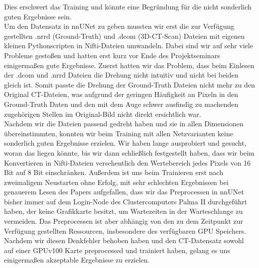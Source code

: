 Dies erschwert das Training und könnte eine Begründung für die nicht sonderlich guten Ergebnisse sein.\\
Um den Datensatz in nnUNet zu geben mussten wir erst die zur Verfügung gestellten .nrrd (Ground-Truth) und .dcom (3D-CT-Scan) Dateien mit eigenen kleinen Pythonscripten \cite{autoMLGithub} in Nifti-Dateien umwandeln. Dabei sind wir auf sehr viele Probleme gestoßen und hatten erst kurz vor Ende des Projektseminars einigermaßen gute Ergebnisse. Zuerst hatten wir das Problem, dass beim Einlesen der .dcom und .nrrd Dateien die Drehung nicht intuitiv und nicht bei beiden gleich ist. Somit passte die Drehung der Ground-Truth Dateien nicht mehr zu den Original CT-Dateien, was aufgrund der geringen Häufigkeit an Pixeln in den Ground-Truth Daten und den mit dem Auge schwer ausfindig zu machenden zugehörigen Stellen im Original-Bild nicht direkt ersichtlich war.\\
Nachdem wir die Dateien passend gedreht haben und sie in allen Dimensionen übereinstimmten, konnten wir beim Training mit allen Netzvarianten keine sonderlich  guten Ergebnisse erzielen. Wir haben lange ausprobiert und gesucht, woran das liegen könnte, bis wir dann schließlich festgestellt haben, dass wir beim Konvertieren in Nifti-Dateien versehentlich den Wertebereich jedes Pixels von 16 Bit auf 8 Bit einschränken. Außerdem ist uns beim Trainieren erst nach zweimaligem Neustarten ohne Erfolg, mit sehr schlechten Ergebnissen bei genauerem Lesen des Papers aufgefallen, dass wir das Preprocessen in nnUNet bisher immer auf dem Login-Node des Clustercomputers Palma II durchgeführt haben, der keine Grafikkarte besitzt, um Wartezeiten in der Warteschlange zu vermeiden. Das Preprocessen ist aber abhängig von den zu dem Zeitpunkt zur Verfügung gestellten Ressourcen, insbesondere des verfügbaren GPU Speichers. Nachdem wir diesen Denkfehler behoben haben und den CT-Datensatz sowohl auf einer GPUv100 Karte preprocessed und trainiert haben, gelang es uns einigermaßen akzeptable Ergebnisse zu erzielen.



